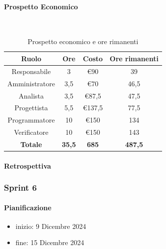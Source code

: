 \documentclass{article}
\begin{document}
                \paragraph{Prospetto Economico}\mbox{}\\
                \begin{table}[H]
                    \centering
                    \begin{tabular}{|c|c|c|c|}
                    \hline
                    \textbf{Ruolo}  & \textbf{Ore}  & \textbf{Costo} & \textbf{Ore rimanenti} \\ \hline
                    Responsabile    & 3             & €90            & 39                     \\ \hline
                    Amministratore  & 3,5           & €70            & 46,5                   \\ \hline
                    Analista        & 3,5           & €87,5          & 47,5                   \\ \hline
                    Progettista     & 5,5           & €137,5         & 77,5                   \\ \hline
                    Programmatore   & 10            & €150           & 134                    \\ \hline
                    Verificatore    & 10            & €150           & 143                    \\ \hline
                    \textbf{Totale} & \textbf{35,5} & \textbf{685}   & \textbf{487,5}         \\ \hline
                    \end{tabular}
                    \caption{Prospetto economico e ore rimanenti}
                \end{table}

                \paragraph{Retrospettiva}
            \subsubsection{Sprint 6}
                \paragraph{Pianificazione}
                \begin{itemize}
                    \item inizio: 9 Dicembre 2024
                    \item fine: 15 Dicembre 2024
                \end{itemize}
\end{document}
